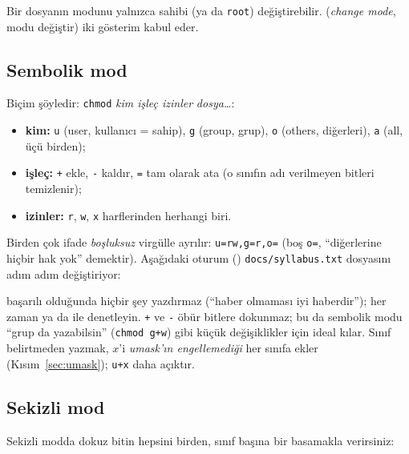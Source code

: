 Bir dosyanın modunu yalnızca sahibi (ya da \texttt{root}) değiştirebilir.  (\emph{change mode}, modu değiştir) iki gösterim kabul eder.

\subsection{Sembolik mod}

Biçim şöyledir: \texttt{chmod} \emph{kim işleç izinler} \emph{dosya\dots}:
\begin{itemize}
  \item \textbf{kim:} \texttt{u} (user, kullanıcı = sahip), \texttt{g} (group, grup), \texttt{o} (others, diğerleri), \texttt{a} (all, üçü birden);
  \item \textbf{işleç:} \texttt{+} ekle, \texttt{-} kaldır, \texttt{=} tam olarak ata (o sınıfın adı verilmeyen bitleri temizlenir);
  \item \textbf{izinler:} \texttt{r}, \texttt{w}, \texttt{x} harflerinden herhangi biri.
\end{itemize}
Birden çok ifade \emph{boşluksuz} virgülle ayrılır: \texttt{u=rw,g=r,o=} (boş \texttt{o=}, ``diğerlerine hiçbir hak yok'' demektir). Aşağıdaki oturum () \texttt{docs/syllabus.txt} dosyasını adım adım değiştiriyor:



 başarılı olduğunda hiçbir şey yazdırmaz (``haber olmaması iyi haberdir''); her zaman  ya da  ile denetleyin. \texttt{+} ve \texttt{-} öbür bitlere dokunmaz; bu da sembolik modu ``grup da yazabilsin'' (\texttt{chmod g+w}) gibi küçük değişiklikler için ideal kılar. Sınıf belirtmeden  yazmak, $x$'i \emph{umask'ın engellemediği} her sınıfa ekler (Kısım~\ref{sec:umask}); \texttt{u+x} daha açıktır.

\subsection{Sekizli mod}

Sekizli modda dokuz bitin hepsini birden, sınıf başına bir basamakla verirsiniz:

